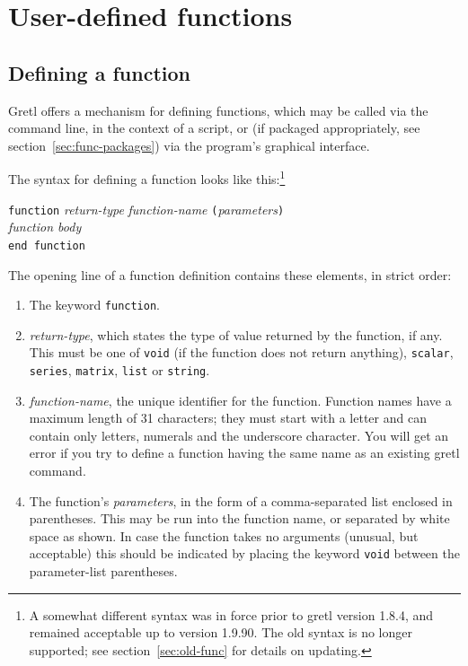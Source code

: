 \chapter{User-defined functions}
\label{chap:functions}

\section{Defining a function}
\label{func-define}

Gretl offers a mechanism for defining functions, which may be
called via the command line, in the context of a script, or (if
packaged appropriately, see section~\ref{sec:func-packages}) via the
program's graphical interface.

The syntax for defining a function looks like this:\footnote{A
  somewhat different syntax was in force prior to gretl version 1.8.4,
  and remained acceptable up to version 1.9.90. The old syntax is no
  longer supported; see section~\ref{sec:old-func} for details on
  updating.}

\begin{raggedright}
\texttt{function} \textsl{return-type} \textsl{function-name}
\texttt{(}\textsl{parameters}\texttt{)} \\
\qquad  \textsl{function body} \\
\texttt{end function}
\end{raggedright}

The opening line of a function definition contains these elements, in
strict order:

\begin{enumerate}
\item The keyword \texttt{function}.
\item \textsl{return-type}, which states the type of value returned by
  the function, if any.  This must be one of \texttt{void} (if the
  function does not return anything), \texttt{scalar},
  \texttt{series}, \texttt{matrix}, \texttt{list} or \texttt{string}.
\item \textsl{function-name}, the unique identifier for the function.
  Function names have a maximum length of 31 characters; they must
  start with a letter and can contain only letters, numerals and the
  underscore character.  You will get an error if you try to define a
  function having the same name as an existing gretl command.
\item The function's \textsl{parameters}, in the form of a
  comma-separated list enclosed in parentheses.  This may be run into
  the function name, or separated by white space as shown.  In case
  the function takes no arguments (unusual, but acceptable) this
  should be indicated by placing the keyword \texttt{void} between
  the parameter-list parentheses.
\end{enumerate}

